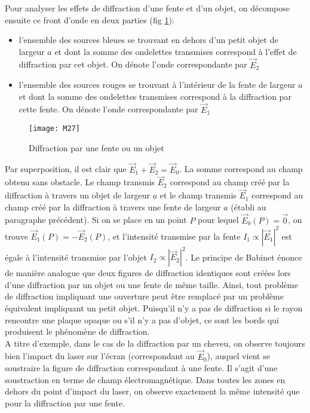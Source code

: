 \noindent Pour analyser les effets de diffraction d'une fente et d'un objet, on décompose ensuite ce front d'onde en deux parties (fig \ref{d2}):
\begin{itemize}
    \item l'ensemble des sources bleues se trouvant en dehors d'un petit objet de largeur $a$ et dont la somme des ondelettes transmises correspond à l'effet de diffraction par cet objet. On dénote l'onde correspondante par $\overset\rightarrow{E}_2$
    \item l'ensemble des sources rouges se trouvant à l'intérieur de la fente de largeur $a$ et dont la somme des ondelettes transmises correspond à la diffraction par cette fente. On dénote l'onde correspondante par $\overset\rightarrow{E}_1$
\end{itemize}

\begin{figure}[h]
    \centering
    \texttt{[image: M27]}
    \caption{Diffraction par une fente ou un objet}
    \label{d2}
\end{figure}

\noindent Par superposition, il est clair que $\overset\rightarrow{E}_1+\overset\rightarrow{E}_2=\overset\rightarrow{E}_0$. La somme correspond au champ obtenu sans obstacle. Le champ transmis $\overset\rightarrow{E}_2$ correspond au champ créé par la diffraction à travers un objet de largeur $a$ et le champ transmis $\overset\rightarrow{E}_1$ correspond au champ créé par la diffraction à travers une fente de largeur $a$ (établi au paragraphe précédent).
Si on se place en un point $P$ pour lequel $\overset\rightarrow{E}_0(P)=\overset\rightarrow{0}$, on trouve $\overset\rightarrow{E}_1(P)=-\overset\rightarrow{E}_2(P)$, et l'intensité transmise par la fente $I_1\propto |\overset\rightarrow{E}_1|^2$ est égale à l'intensité transmise par l'objet $I_2\propto |\overset\rightarrow{E}_2|^2$. Le principe de Babinet énonce de manière analogue que deux figures de diffraction identiques sont créées lors d'une diffraction par un objet ou une fente de même taille. Ainsi, tout problème de diffraction impliquant une ouverture peut être remplacé par un problème équivalent impliquant un petit objet. Puisqu'il n'y a pas de diffraction si le rayon rencontre une plaque opaque ou s'il n'y a pas d'objet, ce sont les bords qui produisent le phénomène de diffraction.\\

\noindent A titre d'exemple, dans le cas de la diffraction par un cheveu, on observe toujours bien l'impact du laser sur l'écran (correspondant au $\overset\rightarrow{E}_0$), auquel vient se soustraire la figure de diffraction correspondant à une fente. Il s'agit d'une soustraction en terme de champ électromagnétique. Dans toutes les zones en dehors du point d'impact du laser, on observe exactement la même intensité que pour la diffraction par une fente.\\



